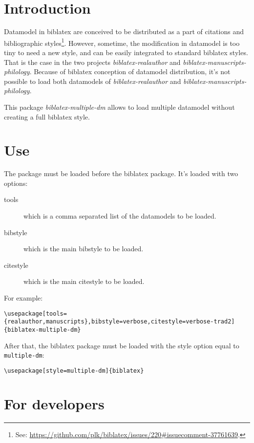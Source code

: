 \documentclass{ltxdockit}[2011/03/25]
\newcommand{\biblatex}{biblatex\xspace}
\begin{document}
\printtitlepage
\tableofcontents

\section{Introduction}
Datamodel in \biblatex are conceived to be distributed as a part of citations and bibliographic styles\footnote{See: \url{https://github.com/plk/biblatex/issues/220\#issuecomment-37761639}.}. However, sometime, the modification in datamodel is too tiny to need a new style, and can be easily integrated to standard \biblatex styles. That is the case in the two projects \emph{biblatex-realauthor} and \emph{biblatex-manuscripts-philology}. Because of \biblatex conception of datamodel distribution, it's not possible to load both datamodels of \emph{biblatex-realauthor} and \emph{biblatex-manuscripts-philology}.

This package \emph{biblatex-multiple-dm} allows to load multiple datamodel without creating a full \biblatex style. 

\section{Use}
The package must be loaded before the \biblatex package. It's loaded with two options:
\begin{description}
	\item[tools] which is a comma separated list of the datamodels to be loaded.
	\item[bibstyle] which is the main bibstyle to be loaded.
	\item[citestyle] which is the main citestyle to be loaded.
\end{description}

For example:
\begin{verbatim}
\usepackage[tools={realauthor,manuscripts},bibstyle=verbose,citestyle=verbose-trad2]{biblatex-multiple-dm}
\end{verbatim}

After that, the \biblatex package must be loaded with the style option equal to \verb+multiple-dm+:
\begin{verbatim}
\usepackage[style=multiple-dm]{biblatex}
\end{verbatim}


\section{For developers} 
\end{document}

